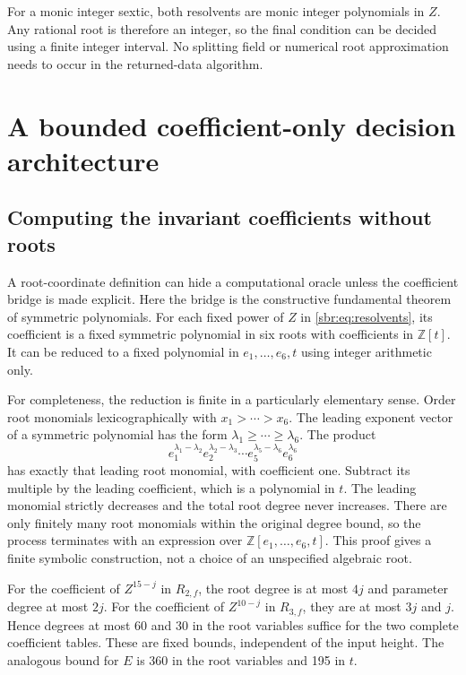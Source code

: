\documentclass[11pt,letterpaper]{article}
\numberwithin{equation}{section}
\theoremstyle{definition}
\theoremstyle{remark}
\newcommand{\ZZ}{\mathbb Z}
\newcommand{\Rtwo}{R_{2,f}}
\newcommand{\Rthree}{R_{3,f}}
\begin{document}
For a monic integer sextic, both resolvents are monic integer polynomials
in $Z$. Any rational root is therefore an integer, so the final condition
can be decided using a finite integer interval. No splitting field or
numerical root approximation needs to occur in the returned-data algorithm.

\section{A bounded coefficient-only decision architecture}
\label{sbr:sec:algorithm}

\subsection{Computing the invariant coefficients without roots}

A root-coordinate definition can hide a computational oracle unless the
coefficient bridge is made explicit. Here the bridge is the constructive
fundamental theorem of symmetric polynomials. For each fixed power of $Z$
in \cref{sbr:eq:resolvents}, its coefficient is a fixed symmetric polynomial
in six roots with coefficients in $\ZZ[t]$. It can be reduced to a fixed
polynomial in $e_1,\ldots,e_6,t$ using integer arithmetic only.

For completeness, the reduction is finite in a particularly elementary
sense. Order root monomials lexicographically with
$x_1>\cdots>x_6$. The leading exponent vector of a symmetric polynomial
has the form $\lambda_1\ge\cdots\ge\lambda_6$. The product
\begin{equation}
 e_1^{\lambda_1-\lambda_2}e_2^{\lambda_2-\lambda_3}
 \cdots e_5^{\lambda_5-\lambda_6}e_6^{\lambda_6}
 \label{sbr:eq:symmetric-reduction}
\end{equation}
has exactly that leading root monomial, with coefficient one. Subtract its
multiple by the leading coefficient, which is a polynomial in $t$.
The leading monomial strictly decreases and the total root degree never
increases. There are only finitely many root monomials within the original
degree bound, so the process terminates with an expression over
$\ZZ[e_1,\ldots,e_6,t]$. This proof gives a finite symbolic construction,
not a choice of an unspecified algebraic root.

For the coefficient of $Z^{15-j}$ in $\Rtwo$, the root degree is at most
$4j$ and parameter degree at most $2j$. For the coefficient of $Z^{10-j}$
in $\Rthree$, they are at most $3j$ and $j$. Hence degrees at most 60 and
30 in the root variables suffice for the two complete coefficient tables.
These are fixed bounds, independent of the input height. The analogous
bound for $E$ is 360 in the root variables and 195 in $t$.
\end{document}
